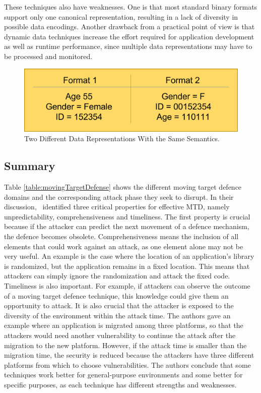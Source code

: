 These techniques also have weaknesses. One is that most standard binary formats support only one canonical representation, resulting in a lack of diversity in possible data encodings. Another drawback from a practical point of view is that dynamic data techniques increase the effort required for application development as well as runtime performance, since multiple data representations may have to be processed and monitored.




\begin{figure}[tph]
\includegraphics[scale=0.2]{assets/dynamicData.png}
\centering
\caption{Two Different Data Representations With the Same Semantics.}\label{fig:differentDataFormats}
\end{figure}


\subsection{Summary}
Table \ref{table:movingTargetDefense} shows the different moving target defence domains and the corresponding attack phase they seek to disrupt. In their discussion,~\cite{article:okhraviFindingFocus} identified three critical properties for effective MTD, namely unpredictability, comprehensiveness and timeliness. The first property is crucial because if the attacker can predict the next movement of a defence mechanism, the defence becomes obsolete. Comprehensiveness means the inclusion of all elements that could work against an attack, as one element alone may not be very useful. An example is the case where the location of an application's library is randomized, but the application remains in a fixed location. This means that attackers can simply ignore the randomization and attack the fixed code. Timeliness is also important. For example, if attackers can observe the outcome of a moving target defence technique, this knowledge could give them an opportunity to attack. It is also crucial that the attacker is exposed to the diversity of the environment within the attack time. The authors gave an example where an application is migrated among three platforms, so that the attackers would need another vulnerability to continue the attack after the migration to the new platform. However, if the attack time is smaller than the migration time, the security is reduced because the attackers have three different platforms from which to choose vulnerabilities. The authors conclude that some techniques work better for general-purpose environments and some better for specific purposes, as each technique has different strengths and weaknesses.    



